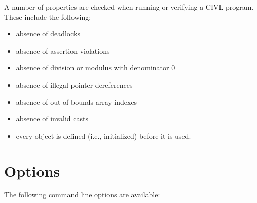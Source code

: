 A number of properties are checked when running or verifying
a CIVL program.  These include the following:
\begin{itemize}
\item absence of deadlocks
\item absence of assertion violations
\item absence of division or modulus with denominator $0$
\item absence of illegal pointer dereferences
\item absence of out-of-bounds array indexes
\item absence of invalid casts
\item every object is defined (i.e., initialized) before
  it is used.
\end{itemize}


\section{ Options}

The following command line options are available:

\newenvironment{optionlist}{\begin{flushleft}}{\end{flushleft}}
\newcommand{\option}[2]{#1\\[0mm]\makebox[5mm]{}#2\\[3mm]}
\newcommand{\booloption}[3]{\option{\ct{-#1} or \ct{-#1=}\textit{boolean}
    (default: \ct{#2})}{#3}}
\newcommand{\intoption}[3]{\option{\ct{-#1=}\textit{integer}
    (default: \ct{#2})}{#3}}
\newcommand{\mapoption}[2]{\option{\ct{-#1}\textit{key}\ct{=}\textit{value}}{#2}}
\newcommand{\stringoption}[3]{\option{\ct{-#1=}\textit{string}
    (default: \ct{#2})}{#3}}

